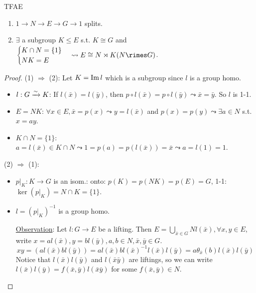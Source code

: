 \begin{prop} TFAE
  \begin{enumerate}
    \item $1\to N\to E\to G\to 1$ splits.
    \item $\exists$ a subgroup $K \le E$ s.t. $K \cong G$ and
      $\begin{cases} K \cap N = \{1\} \\ NK = E\end{cases}
        \leadsto E \cong N \rtimes K (N \rimes G)$.
  \end{enumerate}
  \begin{proof}
    (1) $\Rightarrow$ (2): Let $K = \operatorname{Im} l$ which is a subgroup since $l$
    is a group homo.
    \begin{itemize}
      \item $l: G \xrightarrow{\sim} K$: If $l(\bar{x}) = l(\bar{y})$, then
        $p \circ l(\bar{x}) = p\circ l(\bar{y}) \leadsto \bar{x} = \bar{y}$.
        So $l$ is 1-1.
      \item $E = NK$: $\forall x \in E, \bar{x} = p(x) \leadsto
        y = l(\bar{x})$ and $p(x) = p(y) \leadsto \exists a \in N$ s.t.
        $x = ay$.
      \item $K \cap N = \{1\}$:
        $a = l(\bar{x}) \in K \cap N \leadsto 1 = p(a) = p(l(\bar{x})) = \bar{x}
        \leadsto a = l(1) = 1$.
    \end{itemize}

    (2) $\Rightarrow$ (1):
    \begin{itemize}
      \item $p \big|_K: K \to G$ is an isom.:
        onto: $p(K) = p(NK) = p(E) = G$, 1-1: $\ker(p\big|_K) = N \cap K = \{1\}$.
      \item $l = \left(p\big|_K\right)^{-1}$ is a group homo.

        \underline{Observation}: Let $l: G\to E$ be a lifting.
        Then $E = \bigcup_{\bar{x}\in G} Nl(\bar{x}), \forall x, y \in E$,
        write $x = al(\bar{x}), y = bl(\bar{y}), a, b\in N, \bar{x},\bar{y}\in G$.
        \[
          xy = (al(\bar{x})bl(\bar{y})) = al(\bar{x})bl(\bar{x})^{-1}l(\bar{x})l(\bar{y})
          = a \theta_{\bar{x}}(b)l(\bar{x})l(\bar{y})
        \]
        Notice that $l(\bar{x})l(\bar{y})$ and $l(\bar{x}\bar{y})$ are liftings,
        so we can write $l(\bar{x})l(\bar{y}) = f(\bar{x}, \bar{y})l(\bar{x}\bar{y})$
        for some $f(\bar{x}, \bar{y})\in N$.
    \end{itemize}
  \end{proof}
\end{prop}

